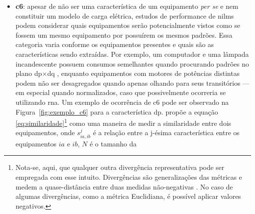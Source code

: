 \begin{itemize}
com oscilações em frequências sub-harmônicas, os mesmos são potenciais
dificultadores à identificação de rastros deixados por outros
equipamentos, particularmente os de menor consumo, caso estudado em
\cite{nilm_liang_pt2_2010_40}. A Figura~\ref{fig:ar_cond_dinamica}
demonstra a dinâmica sub-harmônica causada na envoltória para esse
equipamento. Outros exemplos de equipamentos com motores que também geram
oscilações --- mas em ordem inferior ao ar condicionado --- são:
microondas, geladeira, desumidificador
\cite{nilm_liang_pt2_2010_40};
\begin{figure}[h!t]
\centering
\includegraphics[width=\textwidth]
{imagens/ArCondicionado-CargaDemandaDinamica_ComTextoImpr.pdf}
\caption[\acf{c5}: ar condicionado]
{Exemplo de \acf{c5}: ar condicionado. Também é possível
observar uma alteração gradual no nível de consumo, que irá dificultar
o processo de reconstrução de energia.}
\label{fig:ar_cond_dinamica}
\end{figure}
\item \textbf{\Gls{c6}}: apesar de não ser
uma característica de um equipamento \emph{per se} e nem constituir um
modelo de carga elétrica, estudos de performance de \glspl{nilm} podem
considerar quais equipamentos serão potencialmente vistos como se
fossem um mesmo equipamento por possuírem os mesmos padrões. Essa categoria
varia conforme os equipamentos presentes e quais são as
características sendo extraídas. Por exemplo, um computador e uma
lâmpada incandescente possuem consumos semelhantes quando procurando
padrões no plano \acs{dp}$\times$\acs{dq}
\cite{nilm_laughman_continuous_variables_2003_9}, enquanto
equipamentos com motores de potências distintas podem não ser
desagregados quando apenas olhando para seus transitórios --- em
especial quando normalizados, caso que possivelmente ocorreria se
utilizando \acrfull{rna}. Um exemplo de ocorrência de \acs{c6} pode
ser observado na Figura~\ref{fig:exemplo_c6} para a característica
\acs{dp}. \cite{nilm_liang_pt1_2010_34} propõe a
equação \ref{eq:similaridade}\footnote{Nota-se, aqui, que qualquer 
outra divergência representativa pode ser empregada com esse 
intuito. Divergências são generalizações das métricas e medem a
quase-distância entre duas medidas não-negativas
\cite[cap. 2]{cichocki2009nonnegative}. No caso de algumas
divergências, como a métrica Euclidiana, é possível aplicar valores
negativos.} como uma maneira de medir a similaridade entre dois
equipamentos, onde $s^j_{ia,ib}$ é a relação entre a j-ésima
característica entre os equipamentos $ia$ e $ib$, $N$ é o tamanho da

\end{itemize}
